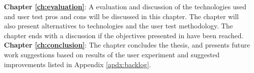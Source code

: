 \textbf{Chapter \ref{ch:evaluation}}: A evaluation and discussion of the technologies used and user test pros and cons will be discussed in this chapter. The chapter will also present alternatives to technologies and the user test methodology. The chapter ends with a discussion if the objectives presented in  have been reached. \\

\textbf{Chapter \ref{ch:conclusion}}: The chapter concludes the thesis, and presents future work suggestions based on results of the user experiment and suggested improvements listed in Appendix \ref{apdx:backlog}.



